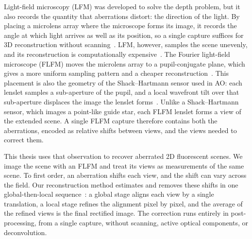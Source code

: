 Light-field microscopy (LFM) was developed to solve the depth problem, but it also records the quantity that aberrations distort: the direction of the light. By placing a microlens array where the microscope forms its image, it records the angle at which light arrives as well as its position, so a single capture suffices for 3D reconstruction without scanning~\cite{levoy2006lightFieldMicroscopy,broxton2013waveOpticsLfm}. LFM, however, samples the scene unevenly, and its reconstruction is computationally expensive~\cite{broxton2013waveOpticsLfm,stefanoiu2019artifactFreeDeconvolution,guo2019fourierLightField}. The Fourier light-field microscope (FLFM) moves the microlens array to a pupil-conjugate plane, which gives a more uniform sampling pattern and a cheaper reconstruction~\cite{guo2019fourierLightField}. This placement is also the geometry of the Shack--Hartmann sensor used in AO: each lenslet samples a sub-aperture of the pupil, and a local wavefront tilt over that sub-aperture displaces the image the lenslet forms~\cite{guo2019fourierLightField,platt2001shackHartmannHistory}. Unlike a Shack--Hartmann sensor, which images a point-like guide star, each FLFM lenslet forms a view of the extended scene. A single FLFM capture therefore contains both the aberrations, encoded as relative shifts between views, and the views needed to correct them.

This thesis uses that observation to recover aberrated 2D fluorescent scenes. We image the scene with an FLFM and treat its views as measurements of the same scene. To first order, an aberration shifts each view, and the shift can vary across the field. Our reconstruction method estimates and removes these shifts in one global-then-local sequence~\cite{shum1998construction}: a global stage aligns each view by a single translation, a local stage refines the alignment pixel by pixel, and the average of the refined views is the final rectified image. The correction runs entirely in post-processing, from a single capture, without scanning, active optical components, or deconvolution.